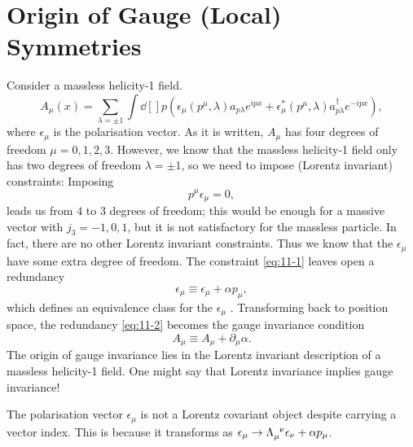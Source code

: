 
\section{Origin of Gauge (Local) Symmetries}%
\label{sec:origin_of_gauge_local_symmetries}

Consider a massless helicity-1 field.
\begin{equation}
  A_{\mu}(x) = \sum_{\lambda=\pm 1} \int \dd[]{p} \left( \epsilon_{\mu}(p^{\mu}, \lambda) a_{p \lambda} e^{i p x} + \epsilon^*_{\mu} (p^{\mu}, \lambda) a^{\dagger}_{p \lambda} e^{-i p x} \right),
\end{equation}
where $\epsilon_{\mu}$  is the polarisation vector.
As it is written, $A_{\mu}$  has four degrees of freedom $\mu = 0,1,2,3$.
However, we know that the massless helicity-1 field only has two degrees of freedom $\lambda = \pm 1$, so we need to impose  (Lorentz invariant) constraints:
Imposing
\begin{equation}
  \label{eq:11-1}
  p^{\mu} \epsilon_{\mu} = 0,
\end{equation}
leads us from $4$  to $3$  degrees of freedom; this would be enough for a massive vector with $j_3 = -1, 0, 1$, but it is not satisfactory for the massless particle. 
In fact, there are no other Lorentz invariant constraints. Thus we know that the $\epsilon_{\mu}$  have some extra degree of freedom. The constraint \eqref{eq:11-1} leaves open a redundancy
\begin{equation}
  \label{eq:11-2}
  \epsilon_{\mu} \equiv \epsilon_{\mu} + \alpha p_{\mu},
\end{equation}
which defines an equivalence class for the $\epsilon_{\mu}$ .
Transforming back to position space, the redundancy \eqref{eq:11-2} becomes the gauge invariance condition
\begin{equation}
  A_{\mu} \equiv A_{\mu} + \partial_{\mu} \alpha.
\end{equation}
The origin of gauge invariance lies in the Lorentz invariant description of a massless helicity-1 field.
One might say that Lorentz invariance implies gauge invariance!
\begin{remark}
  The polarisation vector $\epsilon_{\mu}$ is not a Lorentz covariant object despite carrying a vector index.
  This is because it transforms as $\epsilon_{\mu} \to \Lambda\indices{_{\mu}^{\nu}} \epsilon_{\nu} + \alpha p_{\mu}$.
\end{remark}

